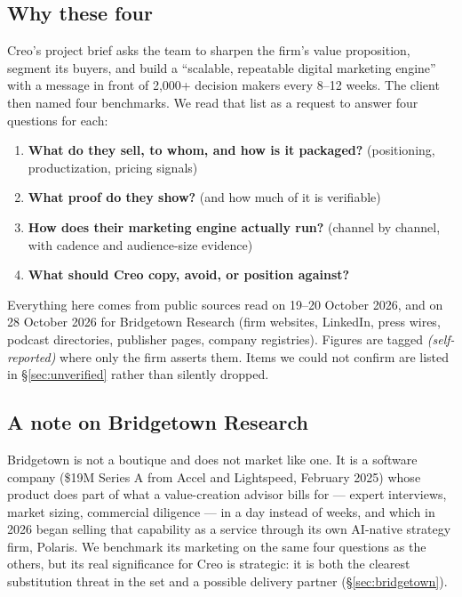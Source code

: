 \documentclass[11pt]{article}
\newcommand{\self}{\textcolor{gray!70!black}{\textit{(self-reported)}}}
\begin{document}
\subsection{Why these four}
Creo's project brief asks the team to sharpen the firm's value proposition, segment its
buyers, and build a ``scalable, repeatable digital marketing engine'' with a message in
front of 2,000+ decision makers every 8--12 weeks. The client then named four
benchmarks. We read that list as a request to answer four questions for each:

\begin{enumerate}
  \item \textbf{What do they sell, to whom, and how is it packaged?} (positioning,
  productization, pricing signals)
  \item \textbf{What proof do they show?} (and how much of it is verifiable)
  \item \textbf{How does their marketing engine actually run?} (channel by channel,
  with cadence and audience-size evidence)
  \item \textbf{What should Creo copy, avoid, or position against?}
\end{enumerate}

Everything here comes from public sources read on 19--20 October 2026, and on 28
October 2026 for Bridgetown Research (firm websites,
LinkedIn, press wires, podcast directories, publisher pages, company registries).
Figures are tagged \self{} where only the firm asserts them. Items we could not confirm
are listed in \S\ref{sec:unverified} rather than silently dropped.

\subsection{A note on Bridgetown Research}
Bridgetown is not a boutique and does not market like one. It is a software company
(\$19M Series A from Accel and Lightspeed, February 2025) whose product does part of
what a value-creation advisor bills for --- expert interviews, market sizing,
commercial diligence --- in a day instead of weeks, and which in 2026 began selling
that capability as a service through its own AI-native strategy firm, Polaris. We
benchmark its marketing on the same four questions as the others, but its real
significance for Creo is strategic: it is both the clearest substitution threat in the
set and a possible delivery partner (\S\ref{sec:bridgetown}).
\end{document}
